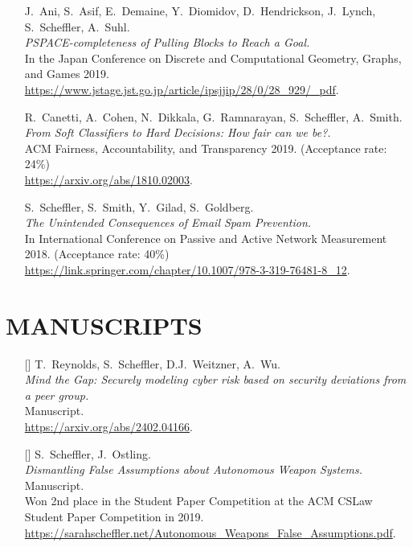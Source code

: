 \documentclass{res}
\begin{document}
\begin{resume}
\begin{itemize}
\item[\pullingblocks] J.~Ani, S.~Asif, E.~Demaine, Y.~Diomidov, D.~Hendrickson, J.~Lynch, S.~Scheffler, A.~Suhl. \\
\emph{PSPACE-completeness of Pulling Blocks to Reach a Goal.}  \\
In the Japan Conference on Discrete and Computational Geometry, Graphs, and Games 2019. \\
\url{https://www.jstage.jst.go.jp/article/ipsjjip/28/0/28_929/_pdf}.

\item[\fairsibility] R.~Canetti, A.~Cohen, N.~Dikkala, G.~Ramnarayan, S.~Scheffler, A.~Smith. \\
\emph{From Soft Classifiers to Hard Decisions: How fair can we be?.} \\
ACM Fairness, Accountability, and Transparency 2019. (Acceptance rate: 24\%) \\
\url{https://arxiv.org/abs/1810.02003}.

\item[\emailspam] S.~Scheffler, S.~Smith, Y.~Gilad, S.~Goldberg. \\
\emph{The Unintended Consequences of Email Spam Prevention.} \\
In International Conference on Passive and Active Network Measurement 2018. (Acceptance rate: 40\%) \\
\url{https://link.springer.com/chapter/10.1007/978-3-319-76481-8\_12}.
\end{itemize}

\section{MANUSCRIPTS}
\vspace{0.25in}

\edef\scramDeviations{[\arabic{citctr}]}
\edef\autonomousWeapons{[\arabic{citctr}]}
\edef\bog{[\arabic{citctr}]}

\begin{itemize}
\item[\scramDeviations] T.~Reynolds, S.~Scheffler, D.J.~Weitzner, A.~Wu. \\
\emph{Mind the Gap: Securely modeling cyber risk based on security deviations from a peer group.} \\
Manuscript.  \\
\url{https://arxiv.org/abs/2402.04166}.

\item[\autonomousWeapons] S.~Scheffler, J.~Ostling. \\
\emph{Dismantling False Assumptions about Autonomous Weapon Systems.} \\
Manuscript.  \\
Won 2nd place in the Student Paper Competition at the ACM CSLaw Student Paper Competition in 2019. \\
\url{https://sarahscheffler.net/Autonomous_Weapons_False_Assumptions.pdf}.


\end{itemize}
\end{resume}
\end{document}
